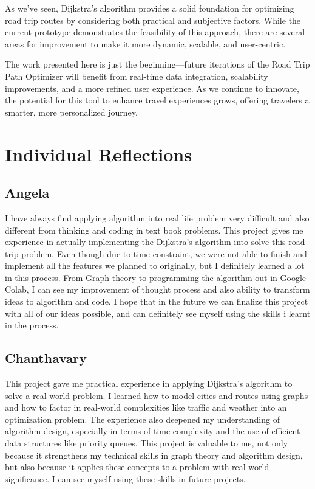 \documentclass{article}
\begin{document}
As we’ve seen, Dijkstra’s algorithm provides a solid foundation for optimizing road trip routes by considering both practical and subjective factors. While the current prototype demonstrates the feasibility of this approach, there are several areas for improvement to make it more dynamic, scalable, and user-centric.

The work presented here is just the beginning—future iterations of the Road Trip Path Optimizer will benefit from real-time data integration, scalability improvements, and a more refined user experience. As we continue to innovate, the potential for this tool to enhance travel experiences grows, offering travelers a smarter, more personalized journey.
\newpage
\section{Individual Reflections}

\subsection{Angela}
I have always find applying algorithm into real life problem very difficult and also different from thinking and coding in text book problems. This project gives me experience in actually implementing the Dijkstra’s algorithm into solve this road trip problem. Even though due to time constraint, we were not able to finish and implement all the features we planned to originally, but I definitely learned a lot in this process. From Graph theory to programming the algorithm out in Google Colab, I can see my improvement of thought process and also ability to transform ideas to algorithm and code. I hope that in the future we can finalize this project with all of our ideas possible, and can definitely see myself using the skills i learnt in the process.

\subsection{Chanthavary}
This project gave me practical experience in applying Dijkstra’s algorithm to solve a real-world problem. I learned how to model cities and routes using graphs and how to factor in real-world complexities like traffic and weather into an optimization problem. The experience also deepened my understanding of algorithm design, especially in terms of time complexity and the use of efficient data structures like priority queues. This project is valuable to me, not only because it strengthens my technical skills in graph theory and algorithm design, but also because it applies these concepts to a problem with real-world significance. I can see myself using these skills in future projects.
\end{document}
